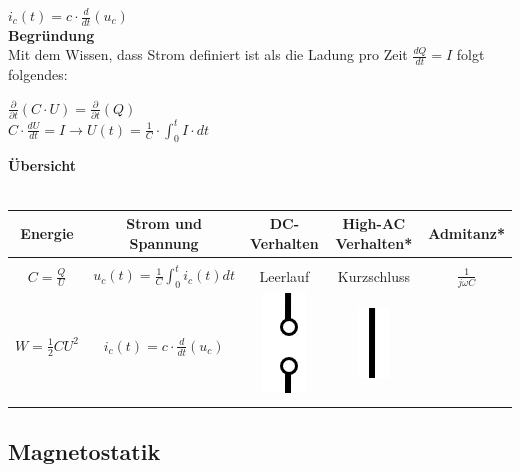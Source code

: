 		$\displaystyle i_c(t) = c \cdot \frac{d}{d t} (u_c)$ \\
		\formulaEnd
		\iend
		\textbf{Begründung} \\
			Mit dem Wissen, dass Strom definiert ist als die Ladung pro Zeit $ \displaystyle \frac{dQ}{dt} = I$ folgt folgendes: \\
			\begin{center}
				\fix
			$\displaystyle \frac{\partial}{\partial t} (C \cdot U) = \frac{\partial}{\partial t} (Q) $ \\
			$ \displaystyle C  \cdot \frac{dU}{dt} = I \rightarrow U(t) = \frac{1}{C} \cdot \int_0^t I \cdot dt$
		\end{center}


\newpage
	\textbf{Übersicht} \\
	\\
	\begin{tabular}{|c|c|c|c|c|}
	\hline
		\textbf{Energie} & 	\textbf{Strom und Spannung} & 	\textbf{ DC-Verhalten} & 	\textbf{ High-AC Verhalten*}& 	\textbf{ Admitanz*} \\
		\hline 	\hline
		 & & & & \\
	    $ \displaystyle C =  \frac{Q}{U} $ & $\displaystyle u_c(t) = \frac{1}{C} \int_0^t i_c(t) dt $ & Leerlauf & Kurzschluss & $ \displaystyle \frac{1}{j\omega C}$  \\
		  $\displaystyle W =  \frac{1}{2} C U^2 $ & $\displaystyle i_c(t) = c \cdot \frac{d}{d t} (u_c) $ & \includegraphics[scale=0.4]{img/leerlauf} &  \includegraphics[scale=0.5]{img/kurzschluss} &   \\
			 & & & & \\
			\hline
	\end{tabular}




\newpage






\subsection{Magnetostatik}

